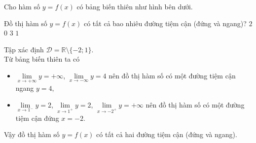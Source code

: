 \begin{ex}%
Cho hàm số $y=f(x)$ có bảng biến thiên như hình bên dưới. 
\begin{center}
\end{center}
Đồ thị hàm số $y=f(x)$ có tất cả bao nhiêu đường tiệm cận (đứng và ngang)?
\choice
{\True $2$}
{$0$}
{$3$}
{$1$}
\loigiai
{Tập xác định $\mathscr{D}=\mathbb{R}\setminus\{-2;1\}$.\\Từ bảng biến thiên ta có 
\begin{itemize}
\item $\lim\limits_{x\to +\infty} y=+\infty$, $\lim\limits_{x\to -\infty} y=4$ nên đồ thị hàm số có một đường tiệm cận ngang $y=4$,
\item $\lim\limits_{x\to 1^-}y=2$, $\lim\limits_{x\to 1^+}y=2$, $\lim\limits_{x\to -2^+}y=+\infty$ nên đồ thị hàm số có một đường tiệm cận đứng $x=-2$.
\end{itemize}
Vậy đồ thị hàm số $y=f(x)$ có tất cả hai đường tiệm cận (đứng và ngang).
}
\end{ex}

